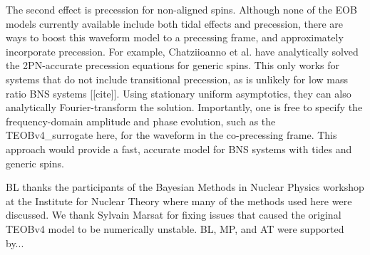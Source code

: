 \documentclass[prd,aps,letter,twocolumn,floatfix,notitlepage,nofootinbib]{revtex4-1}
\begin{document}
The second effect is precession for non-aligned spins. Although none of the EOB models currently available include both tidal effects and precession, there are ways to boost this waveform model to a precessing frame, and approximately incorporate precession. For example, Chatziioanno et al. have analytically solved the 2PN-accurate precession equations for generic spins. This only works for systems that do not include transitional precession, as is unlikely for low mass ratio BNS systems [[cite]]. Using stationary uniform asymptotics, they can also analytically Fourier-transform the solution. Importantly, one is free to specify the frequency-domain amplitude and phase evolution, such as the TEOBv4\_surrogate here, for the waveform in the co-precessing frame. This approach would provide a fast, accurate model for BNS systems with tides and generic spins.


\begin{acknowledgments}

BL thanks the participants of the Bayesian Methods in Nuclear Physics workshop at the Institute for Nuclear Theory where many of the methods used here were discussed. We thank Sylvain Marsat for fixing issues that caused the original TEOBv4 model to be numerically unstable. BL, MP, and AT were supported by... 

\end{acknowledgments}


%     
  
\end{document}
